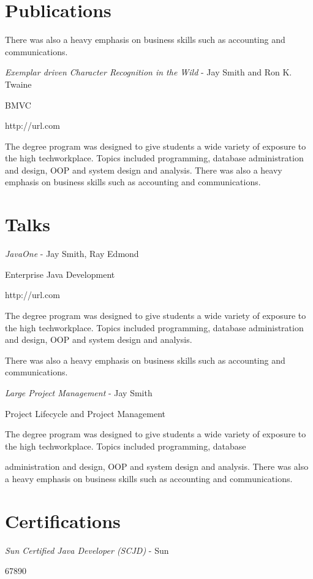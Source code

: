 \documentclass[11pt]{article}
\begin{document}
\section*{Publications}
%
\begin{cvitem}
	There was also a heavy emphasis on business skills such as accounting and communications.
\end{cvitem}%
%
\begin{cvitem}
	\textit{Exemplar driven Character Recognition in the Wild} - Jay Smith and Ron K. Twaine \par
	BMVC \par
	http://url.com \par
	The degree program was designed to give students a wide variety of exposure to the high techworkplace.
    Topics included programming, database administration and design, OOP and system design and analysis.
	There was also a heavy emphasis on business skills such as accounting and communications.
\end{cvitem}%
%
\section*{Talks}
%
\begin{cvitem}%
	\textit{JavaOne} - Jay Smith, Ray Edmond \par
	Enterprise Java Development \par
	http://url.com \par
	The degree program was designed to give students a wide variety of exposure to the high techworkplace.
    Topics included programming, database administration and design, OOP and system design and analysis.
	
	There was also a heavy emphasis on business skills such as accounting and communications.
	
	\textit{Large Project Management} - Jay Smith \par
	Project Lifecycle and Project Management \par
	The degree program was designed to give students a wide variety of exposure to the high techworkplace.
    Topics included programming, database\par
	administration and design, OOP and system design and analysis. There was also a heavy emphasis on
    business skills such as accounting and communications.
\end{cvitem}%
%
\section*{Certifications}
%
\begin{cvitem}
	\textit{Sun Certified Java Developer (SCJD)} - Sun \par
	67890
\end{cvitem}%
%
\end{document}
